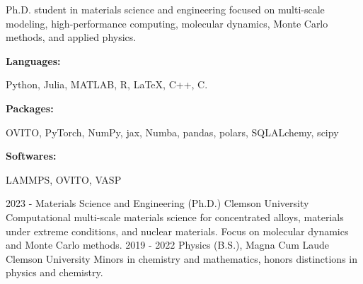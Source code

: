 \documentclass[9pt]{developercv} %
\begin{document}
\begin{minipage}[t]{0.46\textwidth}
	\vspace{-6pt}
 
	Ph.D. student in materials science and engineering focused on multi-scale modeling, high-performance computing, molecular dynamics, Monte Carlo methods, and applied physics. \\
\end{minipage}
\hfill
\begin{minipage}[t]{0.465\textwidth}
    \vspace{-6pt}
    
    \begin{minipage}[t]{0.2\textwidth}
        \textbf{Languages:}
    \end{minipage}
    \hfill
    \begin{minipage}[t]{0.73\textwidth}
    Python, Julia, MATLAB, R, \LaTeX, C++, C.  
    \end{minipage}
    \vspace{4mm}

    \begin{minipage}[t]{0.2\textwidth}
        \textbf{Packages:}
    \end{minipage}
    \hfill
    \begin{minipage}[t]{0.73\textwidth}
    OVITO, PyTorch, NumPy, jax, Numba, pandas, polars, SQLALchemy, scipy
    \end{minipage}
    \vspace{4mm}
    
    \begin{minipage}[t]{0.2\textwidth}
        \textbf{Softwares:}
    \end{minipage}
    \hfill
    \begin{minipage}[t]{0.73\textwidth}
    LAMMPS, OVITO, VASP
    \end{minipage}
    \vspace{1mm}
    
\end{minipage}

\vspace{-10 pt}
\begin{entrylist}
    \entry
		{2023 - }
		{Materials Science and Engineering (Ph.D.)}
		{Clemson University}
		{Computational multi-scale materials science for concentrated alloys, materials under extreme conditions, and nuclear materials. Focus on molecular dynamics and Monte Carlo methods.}
    \entry
		{2019 - 2022}
		{Physics (B.S.), Magna Cum Laude}
		{Clemson University}
		{Minors in chemistry and mathematics, honors distinctions in physics and chemistry.}
\end{entrylist}
\end{document}
